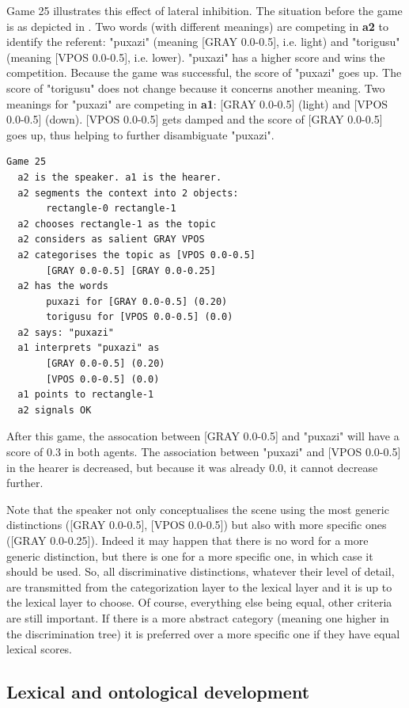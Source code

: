 Game 25 illustrates this effect of 
lateral inhibition. The situation before the game is 
as depicted in . 
Two words (with different meanings) are competing in {\bf a2} to 
identify the referent: "puxazi" (meaning 
[GRAY 0.0-0.5], i.e. light) and "torigusu"
(meaning [VPOS 0.0-0.5], i.e. lower).  "puxazi" has
a higher score and wins the competition. Because the game 
was successful, the score
of "puxazi" goes up. The score of "torigusu" 
does not change because it concerns another 
meaning. Two meanings for "puxazi"
are competing in {\bf a1}: [GRAY 0.0-0.5] (light)
and [VPOS 0.0-0.5] (down). [VPOS 0.0-0.5] gets damped and 
the score of [GRAY 0.0-0.5] goes up, thus helping to 
further disambiguate "puxazi". 
\begin{verbatim}
Game 25
  a2 is the speaker. a1 is the hearer. 
  a2 segments the context into 2 objects: 
       rectangle-0 rectangle-1 
  a2 chooses rectangle-1 as the topic 
  a2 considers as salient GRAY VPOS
  a2 categorises the topic as [VPOS 0.0-0.5] 
       [GRAY 0.0-0.5] [GRAY 0.0-0.25]
  a2 has the words
       puxazi for [GRAY 0.0-0.5] (0.20)
       torigusu for [VPOS 0.0-0.5] (0.0)
  a2 says: "puxazi"
  a1 interprets "puxazi" as
       [GRAY 0.0-0.5] (0.20)
       [VPOS 0.0-0.5] (0.0)
  a1 points to rectangle-1
  a2 signals OK
\end{verbatim}
After this game, the assocation between [GRAY 0.0-0.5] 
and "puxazi" will have a score of 0.3 in both agents. 
The association between "puxazi" and [VPOS 0.0-0.5] 
in the hearer is decreased, but because it was already 
0.0, it cannot decrease further. 

Note that the speaker not only conceptualises the scene using 
the most generic distinctions ([GRAY 0.0-0.5], 
[VPOS 0.0-0.5]) but also
with more specific ones ([GRAY 0.0-0.25]). Indeed it 
may happen that there is no word for a more generic 
distinction, but there is one for a more specific 
one, in which case it should be used. 
So, all discriminative distinctions, 
whatever their level of detail, are
transmitted from the categorization layer to the 
lexical layer and it is up to the lexical layer
to choose. Of course, everything else being equal, 
other criteria are still important. If there is a 
more abstract category (meaning one higher in the 
discrimination tree) it is preferred over a more 
specific one if they have equal lexical scores. 

\subsection{Lexical and ontological development} 

